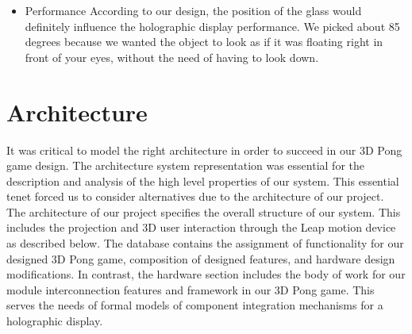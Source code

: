 \documentclass{sig-alternate}
\begin{document}
{\begin{enumerate}
{{\begin{itemize}
{						Methodology\newline
					
						In order for our holography case to project a good holographic display it is necessary to have a black background so the image can emerge from the bottom. The image will then reflect the glass, which is placed at an 85 degree angle from the base and the user. This way, the image will float up on the air like an illusion.\newline
						
						The figure 5 explains the function of the crystal. As you can see, the projector sends the image to the crystal, which is an acrylic glass, and this reflects the image at an 85 degrees. This is giving the user a real feeling about the 3D object existence.
					\newline  
					} 
		
					\item {Performance} {\normalfont\newline
						According to our design, the position of the glass would definitely influence the holographic display performance. We picked about 85 degrees because we wanted the object to look as if it was floating right in front of your eyes, without the need of having to look down. 
					\newline
					}	
			\end{itemize}}}
	\end{enumerate}}

\section{Architecture}
\label{architecture}
	It was critical to model the right architecture in order to succeed in our 3D Pong game design. The architecture system representation was essential for the description and analysis of the high level properties of our system. This essential tenet forced us to consider alternatives due to the architecture of our project. The architecture of our project specifies the overall structure of our system. This includes the projection and 3D user interaction through the Leap motion device as described below. The database contains the assignment of functionality for our designed 3D Pong game, composition of designed features, and hardware design modifications. In contrast, the hardware section includes the body of work for our module interconnection features and framework in our 3D Pong game. This serves the needs of formal models of component integration mechanisms for a holographic display. 
	 
\end{document}
